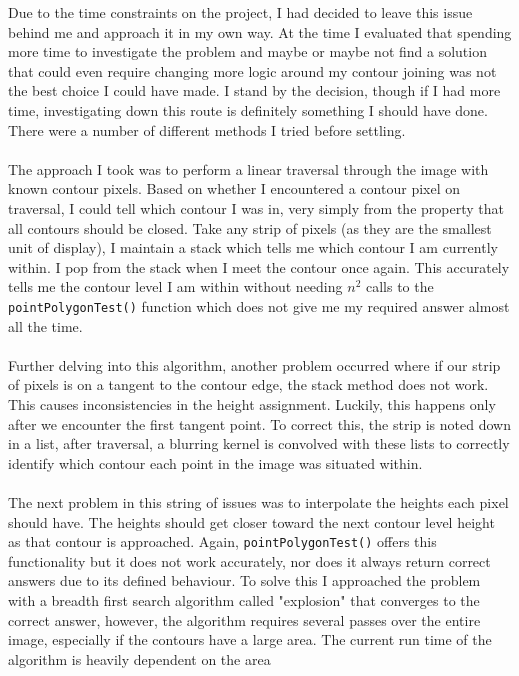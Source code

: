 \documentclass[11pt]{article}
\begin{document}
Due to the time constraints on the project, I had decided to leave this issue
behind me and approach it in my own way. At the time I evaluated that spending
more time to investigate the problem and maybe or maybe not find a solution
that could even require changing more logic around my contour joining was
not the best choice I could have made. I stand by the decision, though if
I had more time, investigating down this route is definitely something I should
have done. There were a number of different methods I tried before
settling.\\
\\
The approach I took was to perform a linear traversal through
the image with known contour pixels. Based on whether I encountered a 
contour pixel on traversal, I could tell which contour I was in, very simply
from the property that all contours should be closed. Take any strip 
of pixels (as they are the smallest unit of display), I maintain a stack which
tells me which contour I am currently within. I pop from the stack when I
meet the contour once again. This accurately tells me the contour level I am
within without needing $n^2$ calls to the \texttt{pointPolygonTest()} function
which does not give me my required answer almost all the time.\\
\\
Further delving into this algorithm, another problem occurred where
if our strip of pixels is on a tangent to the contour edge, the stack method
does not work. This causes inconsistencies in the height assignment. Luckily,
this happens only after we encounter the first tangent point. To correct this,
the strip is noted down in a list, after traversal, a blurring kernel is
convolved with these lists to correctly identify which contour each point
in the image was situated within.\\
\\
The next problem in this string of issues was to interpolate the heights
each pixel should have. The heights should get closer toward the next 
contour level height as that contour is approached. Again, 
\texttt{pointPolygonTest()} offers this functionality but it does not work
accurately, nor does it always return correct answers due to its defined
behaviour. To solve this I approached the problem with a breadth first 
search algorithm called "explosion"
that converges to the correct answer, however, the algorithm
requires several passes over the entire image, especially if the 
contours have a large area. The 
current run time of the algorithm is heavily dependent on the area
\end{document}
